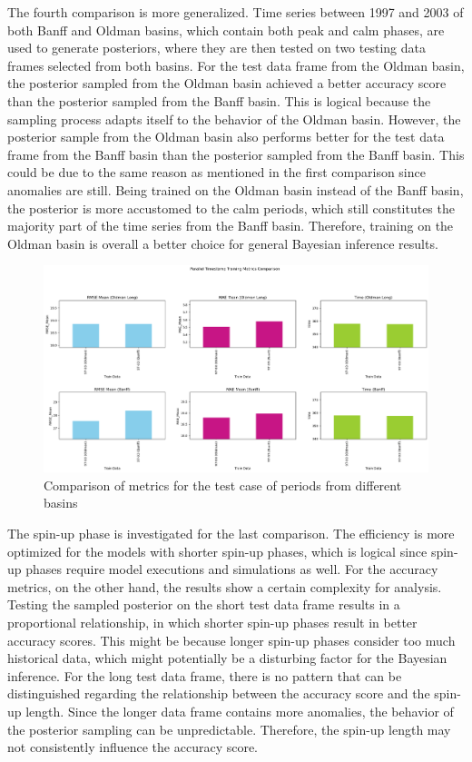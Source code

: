 The fourth comparison is more generalized. Time series between 1997 and 2003 of both Banff and Oldman basins, which contain both peak and calm phases, are used to generate posteriors, where they are then tested on two testing data frames selected from both basins. For the test data frame from the Oldman basin, the posterior sampled from the Oldman basin achieved a better accuracy score than the posterior sampled from the Banff basin. This is logical because the sampling process adapts itself to the behavior of the Oldman basin. However, the posterior sample from the Oldman basin also performs better for the test data frame from the Banff basin than the posterior sampled from the Banff basin. This could be due to the same reason as mentioned in the first comparison since anomalies are still. 
Being trained on the Oldman basin instead of the Banff basin, the posterior is more accustomed to the calm periods, which still constitutes the majority part of the time series from the Banff basin. Therefore, training on the Oldman basin is overall a better choice for general Bayesian inference results.
\begin{figure}[H]
    \centering
    \includegraphics[width=.8\textwidth]{figures/time_series_analysis/comparison/parallel_timestamp.png}
    \captionsetup{width=.8\textwidth}
    \caption{Comparison of metrics for the test case of periods from different basins}
    \label{fig:enter-label}
\end{figure}

The spin-up phase is investigated for the last comparison. The efficiency is more optimized for the models with shorter spin-up phases, which is logical since spin-up phases require model executions and simulations as well. For the accuracy metrics, on the other hand, the results show a certain complexity for analysis. Testing the sampled posterior on the short test data frame results in a proportional relationship, in which shorter spin-up phases result in better accuracy scores. This might be because longer spin-up phases consider too much historical data, which might potentially be a disturbing factor for the Bayesian inference. For the long test data frame, there is no pattern that can be distinguished regarding the relationship between the accuracy score and the spin-up length. Since the longer data frame contains more anomalies, the behavior of the posterior sampling can be unpredictable. Therefore, the spin-up length may not consistently influence the accuracy score.

